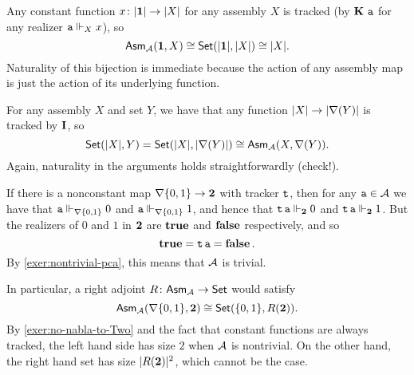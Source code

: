 

Any constant function \(x \colon \carrier{\One} \to \carrier{X}\) for any
assembly \(X\) is tracked (by \(\kcomb\,\pca{a}\) for any realizer
\(\pca{a} \realizes_X x\)), so
\[ \Asm\AA(\One, X) \cong \Set(\carrier{\One},\carrier{X}) \cong \carrier{X}. \]
Naturality of this bijection is immediate because the action of any assembly map
is just the action of its underlying function.




For any assembly \(X\) and set \(Y\), we have that any function
\(\carrier{X} \to \carrier{\nabla(Y)}\) is tracked by \(\icomb\), so
\[ \Set(\carrier{X},Y) = \Set(\carrier{X},\carrier{\nabla(Y)}) \cong \Asm\AA(X,\nabla(Y)). \]
Again, naturality in the arguments holds straightforwardly (check!).




\newcommand{\natwo}{\nabla\{0,1\}}

If there is a nonconstant map \(\natwo \to \Two\) with tracker \(\pca t\), then
for any \(\pca a \in \AA\) we have that
\(\pca a \realizes_{\natwo} 0\) and
\(\pca a \realizes_{\natwo} 1\), and hence that
\(\pca t \pca a \realizes_{\Two} 0\) and
\(\pca t \pca a \realizes_{\Two} 1\).
But the realizers of \(0\) and \(1\) in \(\Two\) are \(\pcatrue\) and
\(\pcafalse\) respectively, and so
\[ \pcatrue = \pca t \pca a = \pcafalse. \]
By \cref{exer:nontrivial-pca}, this means that \(\AA\) is trivial.




In particular, a right adjoint \(R \colon \Asm\AA \to \Set\) would satisfy
\[ \Asm\AA(\natwo, \Two) \cong \Set(\{0,1\}, R(\Two)). \]
By \cref{exer:no-nabla-to-Two} and the fact that constant functions are always
tracked, the left hand side has size \(2\) when \(\AA\) is nontrivial.
On the other hand, the right hand set has size \(\lvert R(\Two)\rvert^2\), which
cannot be the case.




